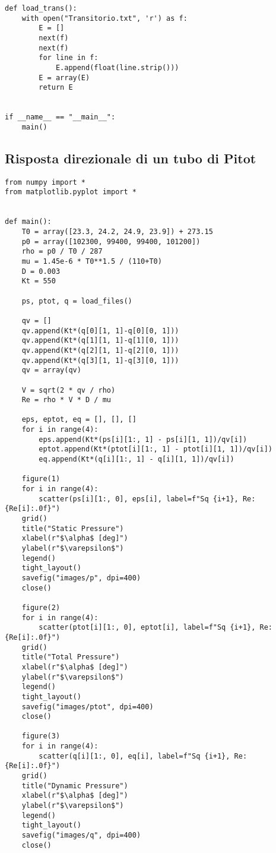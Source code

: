 \begin{lstlisting}
def load_trans():
    with open("Transitorio.txt", 'r') as f:
        E = []
        next(f)
        next(f)
        for line in f:
            E.append(float(line.strip()))
        E = array(E)
        return E
    

if __name__ == "__main__":
    main()
\end{lstlisting}

\subsection{Risposta direzionale di un tubo di Pitot}\label{b2}
\begin{lstlisting}
from numpy import *
from matplotlib.pyplot import *


def main():
    T0 = array([23.3, 24.2, 24.9, 23.9]) + 273.15
    p0 = array([102300, 99400, 99400, 101200])
    rho = p0 / T0 / 287
    mu = 1.45e-6 * T0**1.5 / (110+T0)
    D = 0.003
    Kt = 550

    ps, ptot, q = load_files()

    qv = []
    qv.append(Kt*(q[0][1, 1]-q[0][0, 1]))
    qv.append(Kt*(q[1][1, 1]-q[1][0, 1]))
    qv.append(Kt*(q[2][1, 1]-q[2][0, 1]))
    qv.append(Kt*(q[3][1, 1]-q[3][0, 1]))
    qv = array(qv)

    V = sqrt(2 * qv / rho)
    Re = rho * V * D / mu

    eps, eptot, eq = [], [], []
    for i in range(4):
        eps.append(Kt*(ps[i][1:, 1] - ps[i][1, 1])/qv[i])
        eptot.append(Kt*(ptot[i][1:, 1] - ptot[i][1, 1])/qv[i])
        eq.append(Kt*(q[i][1:, 1] - q[i][1, 1])/qv[i])

    figure(1)
    for i in range(4):
        scatter(ps[i][1:, 0], eps[i], label=f"Sq {i+1}, Re: {Re[i]:.0f}")
    grid()
    title("Static Pressure")
    xlabel(r"$\alpha$ [deg]")
    ylabel(r"$\varepsilon$")
    legend()
    tight_layout()
    savefig("images/p", dpi=400)
    close()

    figure(2)
    for i in range(4):
        scatter(ptot[i][1:, 0], eptot[i], label=f"Sq {i+1}, Re: {Re[i]:.0f}")
    grid()
    title("Total Pressure")
    xlabel(r"$\alpha$ [deg]")
    ylabel(r"$\varepsilon$")
    legend()
    tight_layout()
    savefig("images/ptot", dpi=400)
    close()

    figure(3)
    for i in range(4):
        scatter(q[i][1:, 0], eq[i], label=f"Sq {i+1}, Re: {Re[i]:.0f}")
    grid()
    title("Dynamic Pressure")  
    xlabel(r"$\alpha$ [deg]")
    ylabel(r"$\varepsilon$")
    legend()
    tight_layout()
    savefig("images/q", dpi=400)
    close()


\end{lstlisting}
